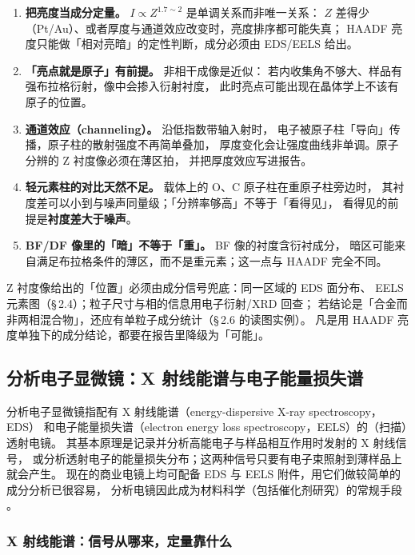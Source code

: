 \begin{pitfall}
\begin{enumerate}[leftmargin=1.6em]
\item \textbf{把亮度当成分定量。} $I\propto Z^{1.7\sim2}$ 是单调关系而非唯一关系：
$Z$ 差得少（Pt/Au）、或者厚度与通道效应改变时，亮度排序都可能失真；
HAADF 亮度只能做「相对亮暗」的定性判断，成分必须由 EDS/EELS 给出。
\item \textbf{「亮点就是原子」有前提。} 非相干成像是近似：
若内收集角不够大、样品有强布拉格衍射，像中会掺入衍射衬度，
此时亮点可能出现在晶体学上不该有原子的位置。
\item \textbf{通道效应（channeling）。} 沿低指数带轴入射时，
电子被原子柱「导向」传播，原子柱的散射强度不再简单叠加，
厚度变化会让强度曲线非单调。原子分辨的 Z 衬度像必须在薄区拍，
并把厚度效应写进报告。
\item \textbf{轻元素柱的对比天然不足。} 载体上的 O、C 原子柱在重原子柱旁边时，
其衬度差可以小到与噪声同量级；「分辨率够高」不等于「看得见」，
看得见的前提是\textbf{衬度差大于噪声}。
\item \textbf{BF/DF 像里的「暗」不等于「重」。} BF 像的衬度含衍衬成分，
暗区可能来自满足布拉格条件的薄区，而不是重元素；这一点与 HAADF 完全不同。
\end{enumerate}
\end{pitfall}

\begin{crosscheck}
Z 衬度像给出的「位置」必须由成分信号兜底：同一区域的 EDS 面分布、
EELS 元素图（\S\,2.4）；粒子尺寸与相的信息用电子衍射/XRD 回查；
若结论是「合金而非两相混合物」，还应有单粒子成分统计（\S\,2.6 的读图实例）。
凡是用 HAADF 亮度单独下的成分结论，都要在报告里降级为「可能」。
\end{crosscheck}

\subsection{分析电子显微镜：X 射线能谱与电子能量损失谱}

分析电子显微镜指配有 X 射线能谱（energy-dispersive X-ray spectroscopy，EDS）
和电子能量损失谱（electron energy loss spectroscopy，EELS）的（扫描）透射电镜。
其基本原理是记录并分析高能电子与样品相互作用时发射的 X 射线信号，
或分析透射电子的能量损失分布；这两种信号只要有电子束照射到薄样品上就会产生。
现在的商业电镜上均可配备 EDS 与 EELS 附件，用它们做较简单的成分分析已很容易，
分析电镜因此成为材料科学（包括催化剂研究）的常规手段
。

\subsubsection{X 射线能谱：信号从哪来，定量靠什么}

